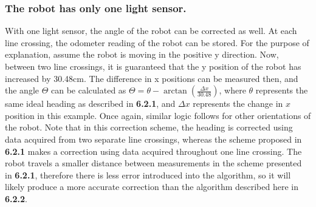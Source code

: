 \documentclass[11pt]{article} %
\begin{document}
\subsubsection{The robot has only one light sensor.}
With one light sensor, the angle of the robot can be corrected as well. At each line crossing, the
odometer reading of the robot can be stored. For the purpose of explanation, assume the robot is
moving in the positive y direction. Now, between two line crossings, it is guaranteed that the y
position of the robot has increased by 30.48cm. The difference in x positions can be measured then,
and the angle $\Theta$ can be calculated as $\Theta = \theta - \arctan{(\frac{\Delta x}{30.48})}$,
where $\theta$ represents the same ideal heading as described in \textbf{6.2.1}, and $\Delta x$
represents the change in $x$ position in this example. Once again, similar logic follows for other
orientations of the robot. Note that in this correction scheme, the heading is corrected using data
acquired from two separate line crossings, whereas the scheme proposed in \textbf{6.2.1} makes a
correction using data acquired throughout one line crossing. The robot travels a smaller distance
between measurements in the scheme presented in \textbf{6.2.1}, therefore there is less error
introduced into the algorithm, so it will likely produce a more accurate correction than the
algorithm described here in \textbf{6.2.2}.
\end{document}
